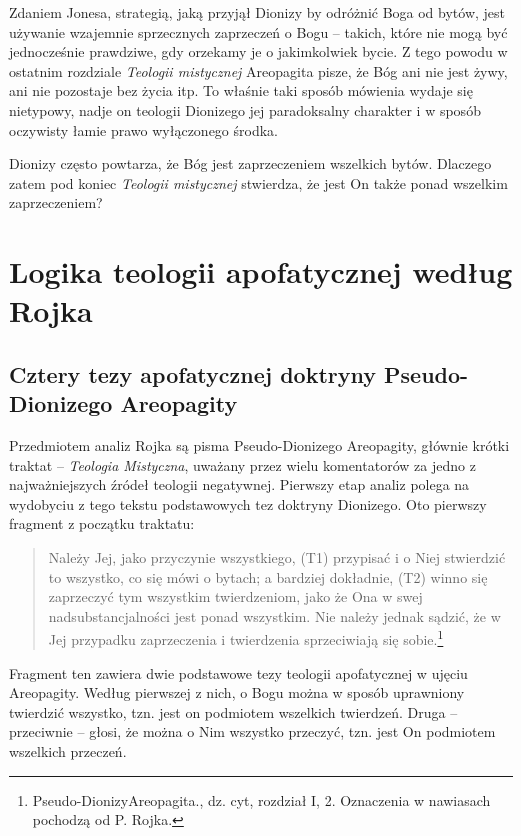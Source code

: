 Zdaniem Jonesa, strategią, jaką przyjął Dionizy by odróżnić Boga od
bytów, jest używanie wzajemnie sprzecznych zaprzeczeń o Bogu -- takich,
które nie mogą być jednocześnie prawdziwe, gdy orzekamy je o
jakimkolwiek bycie. Z tego powodu w ostatnim rozdziale \textit{Teologii
mistycznej} Areopagita pisze, że Bóg ani nie jest żywy, ani nie
pozostaje bez życia itp. To właśnie taki sposób mówienia wydaje się
nietypowy, nadje on teologii Dionizego jej paradoksalny charakter i w
sposób oczywisty łamie prawo wyłączonego środka.

Dionizy często powtarza, że Bóg jest zaprzeczeniem wszelkich bytów.
Dlaczego zatem pod koniec \textit{Teologii mistycznej} stwierdza, że
jest On także ponad wszelkim zaprzeczeniem? %


\clearpage

\section{Logika teologii apofatycznej według Rojka}

\subsection{Cztery tezy apofatycznej doktryny Pseudo-Dionizego Areopagity}

Przedmiotem analiz Rojka są pisma Pseudo-Dionizego Areopagity, głównie
krótki traktat -- \textit{Teologia Mistyczna}, uważany przez wielu
komentatorów za jedno z najważniejszych źródeł teologii negatywnej.
Pierwszy etap analiz polega na wydobyciu z tego tekstu podstawowych tez
doktryny Dionizego. Oto pierwszy fragment z początku traktatu:

\begin{quote}
    Należy Jej, jako przyczynie wszystkiego, (T1) przypisać i o Niej
stwierdzić to wszystko, co się mówi o bytach; a bardziej dokładnie,
(T2) winno się zaprzeczyć tym wszystkim twierdzeniom, jako że Ona w
swej nadsubstancjalności jest ponad wszystkim. Nie należy jednak
sądzić, że w Jej przypadku zaprzeczenia i twierdzenia sprzeciwiają się
sobie.\footnote{Pseudo-DionizyAreopagita., dz. cyt, rozdział I, 2.
Oznaczenia w nawiasach pochodzą od P. Rojka.}
\end{quote}





Fragment ten zawiera dwie podstawowe tezy teologii apofatycznej w ujęciu
Areopagity. Według pierwszej z nich, o Bogu można w sposób uprawniony
twierdzić wszystko, tzn. jest on podmiotem wszelkich twierdzeń. Druga –
przeciwnie -- głosi, że można o Nim wszystko przeczyć, tzn. jest On
podmiotem wszelkich przeczeń.

